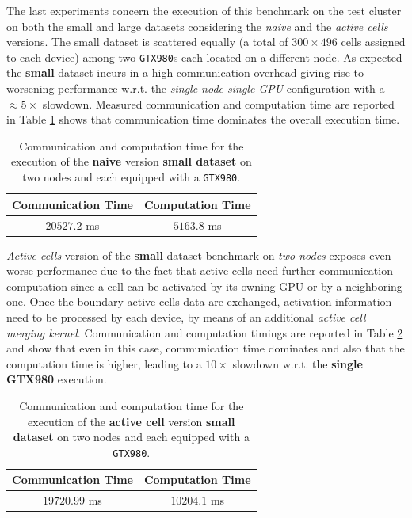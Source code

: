 The last experiments concern the execution of this benchmark on the test cluster on both the small and large datasets considering the \textit{naive} and the \textit{active cells} versions.
The small dataset is scattered equally (a total of $300 \times 496$ cells assigned to each device) among two \texttt{GTX980}s each located on a different node.
As expected the \textbf{small} dataset  incurs in a high communication overhead giving rise to worsening performance w.r.t. the \textit{single node single GPU} configuration with a $\approx 5 \times$ slowdown.
Measured communication and computation time are reported in Table \ref{tab:sciddica_comp_comm_time} shows that communication time dominates the overall execution time.
\begin{table}
	\centering
	\caption{Communication and computation time for the execution of the \textbf{naive} version \textbf{small dataset} on two nodes and each equipped with a \texttt{GTX980}.}
	\label{tab:sciddica_comp_comm_time}
	\begin{tabular}{@{}cc@{}}
		\toprule
		 Communication Time & Computation Time\\ \midrule
		 $20527.2$ \si{ms}      & $5163.8$ \si{ms}   \\
		\bottomrule
	\end{tabular}
\end{table}

\textit{Active cells} version of the \textbf{small} dataset benchmark on \textit{two nodes} exposes even worse performance due to the fact that active cells need further communication computation since a cell can be activated by its owning GPU or by a neighboring one.
Once the boundary active cells data are exchanged, activation information need to be processed by each device, by means of an additional \textit{active cell merging kernel}. Communication and computation timings are reported in Table \ref{tab:sciddica_comp_comm_time_active cell} and show that even in this case, communication time dominates and also that the computation time is higher, leading to a $10 \times$ slowdown w.r.t. the \textbf{single GTX980} execution.
\begin{table}
	\centering
	\caption{Communication and computation time for the execution of the \textbf{active cell} version \textbf{small dataset} on two nodes and each equipped with a \texttt{GTX980}.}
	\label{tab:sciddica_comp_comm_time_active cell}
	\begin{tabular}{@{}cc@{}}
		\toprule
		 Communication Time & Computation Time\\ \midrule
		 $19720.99$ \si{ms}      & $10204.1$ \si{ms}   \\
		\bottomrule
	\end{tabular}
\end{table}

